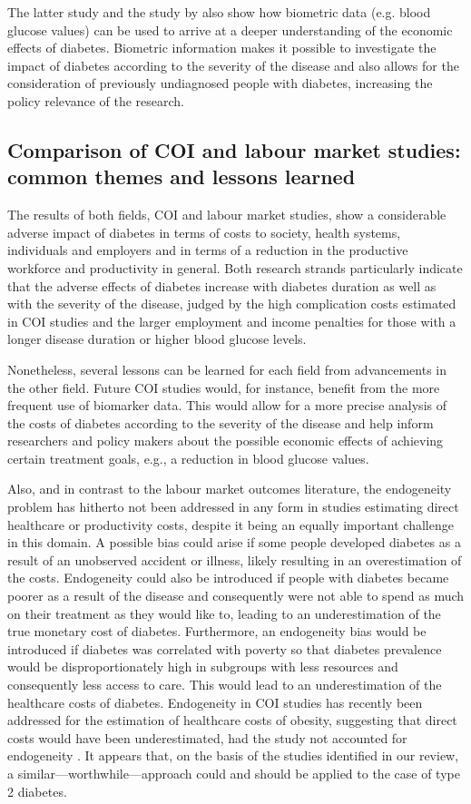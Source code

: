 The latter study and the study by \textcite{Liu2014} also show how biometric data (e.g. blood glucose values) can be used to arrive at a deeper understanding of the economic effects of diabetes. Biometric information makes it possible to investigate the impact of diabetes according to the severity of the disease and also allows for the consideration of previously undiagnosed people with diabetes, increasing the policy relevance of the research.

\subsection{Comparison of COI and labour market studies: common themes and lessons learned}
The results of both fields, \ac{COI} and labour market studies, show a considerable adverse impact of diabetes in terms of costs to society, health systems, individuals and employers and in terms of a reduction in the productive workforce and productivity in general. Both research strands particularly indicate that the adverse effects of diabetes increase with diabetes duration as well as with the severity of the disease, judged by the high complication costs estimated in \ac{COI} studies and the larger employment and income penalties for those with a longer disease duration or higher blood glucose levels. 

Nonetheless, several lessons can be learned for each field from advancements in the other field. Future \ac{COI} studies would, for instance, benefit from the more frequent use of biomarker data. This would allow for a more precise analysis of the costs of diabetes according to the severity of the disease and help inform researchers and policy makers about the possible economic effects of achieving certain treatment goals, e.g., a reduction in blood glucose values.

Also, and in contrast to the labour market outcomes literature, the endogeneity problem has hitherto not been addressed in any form in studies estimating direct healthcare or productivity costs, despite it being an equally important challenge in this domain. A possible bias could arise if some people developed diabetes as a result of an unobserved accident or illness, likely resulting in an overestimation of the costs. Endogeneity could also be introduced if people with diabetes became poorer as a result of the disease and consequently were not able to spend as much on their treatment as they would like to, leading to an underestimation of the true monetary cost of diabetes. Furthermore, an endogeneity bias would be introduced if diabetes was correlated with poverty so that diabetes prevalence would be disproportionately high in subgroups with less resources and consequently less access to care. This would lead to an underestimation of the healthcare costs of diabetes. Endogeneity in \ac{COI} studies has recently been addressed for the estimation of healthcare costs of obesity, suggesting that direct costs would have been underestimated, had the study not accounted for endogeneity \parencite{Cawley2012b}. It appears that, on the basis of the studies identified in our review, a similar---worthwhile---approach could and should be applied to the case of type 2 diabetes.

